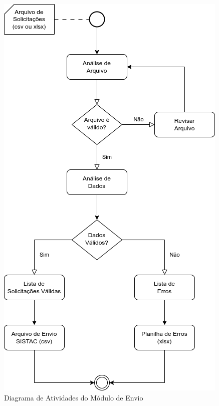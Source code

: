 \documentclass[
	12pt,			%
	openright,		%
	oneside,	
	a4paper,		%
	english,		%
	brazil			%
]{abntex2/abntex2}  %
\begin{document}
		\clearpage
		\begin{figure}[ht]
			\begin{center}
				
				\caption{Diagrama de Atividades do Módulo de Envio}
				\includegraphics[scale=0.75]{img/diagrama-ativs-envio}
				
			\end{center}
		\end{figure}
		
\end{document}
